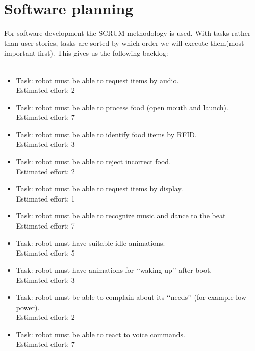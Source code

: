 \documentclass[11pt,twoside,a4paper]{report}
\begin{document}
\section{Software planning}
For software development the SCRUM methodology is used. With tasks rather than user stories,  tasks are sorted by which order we will execute them(most important first). This gives us the following backlog:\\
\\
\begin{itemize}
\item Task: robot must be able to request items by audio. \\
Estimated effort: 2 
\item Task: robot must be able to process food (open mouth and launch).\\
Estimated effort: 7  
\item Task: robot must be able to identify food items by RFID. \\
Estimated effort: 3 
\item Task: robot must be able to reject incorrect food.\\ 
Estimated effort: 2 
\item Task: robot must be able to request items by display.\\
Estimated effort: 1 
\item Task: robot must be able to recognize music and dance to the beat \\
Estimated effort: 7 
\item Task: robot must have suitable idle animations.\\ 
Estimated effort: 5
\item Task: robot must have animations for \lq\lq{}waking up\rq\rq{} after boot.\\ 
Estimated effort: 3 
\item Task: robot must be able to complain about its \lq\lq{}needs\rq\rq{} (for example low power).\\
Estimated effort: 2 
\item Task: robot must be able to react to voice commands.\\
Estimated effort: 7 
\end{itemize}
\end{document}
